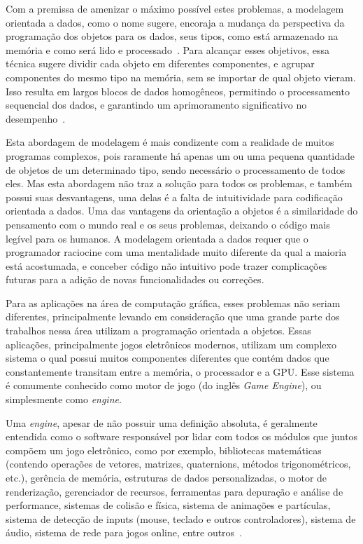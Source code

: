 \documentclass[11pt]{article}
\begin{document}
Com a premissa de amenizar o máximo possível estes problemas, a modelagem orientada a dados, como o nome sugere, encoraja a 
mudança da perspectiva da programação dos objetos para os dados, seus tipos, como está armazenado na memória e como será lido 
e processado~\cite{fabiandod}. Para alcançar esses objetivos, essa técnica sugere dividir cada objeto em diferentes 
componentes, e agrupar componentes do mesmo tipo na memória, sem se importar de qual objeto vieram. Isso resulta em largos 
blocos de dados homogêneos, permitindo o processamento sequencial dos dados, e garantindo um aprimoramento significativo 
no desempenho~\cite{fabiandod}.

Esta abordagem de modelagem é mais condizente com a realidade de muitos programas complexos, pois raramente há apenas um ou uma pequena 
quantidade de objetos de um determinado tipo, sendo necessário o processamento de todos eles. Mas esta abordagem não traz a 
solução para todos os problemas, e também possui suas desvantagens, uma delas é a falta de intuitividade para codificação 
orientada a dados. Uma das vantagens da orientação a objetos é a similaridade do pensamento com o mundo real e os seus 
problemas, deixando o código mais legível para os humanos. A modelagem orientada a dados requer que o programador raciocine com 
uma mentalidade muito diferente da qual a maioria está acostumada, e conceber código não intuitivo pode trazer complicações 
futuras para a adição de novas funcionalidades ou correções.

Para as aplicações na área de computação gráfica, esses problemas não seriam diferentes, principalmente levando em 
consideração que uma grande parte dos trabalhos nessa área utilizam a programação orientada a objetos. Essas aplicações, 
principalmente jogos eletrônicos modernos, utilizam um complexo sistema o qual possui muitos componentes diferentes que 
contém dados que constantemente transitam entre a memória, o processador e a GPU. Esse sistema é comumente conhecido 
como motor de jogo (do inglês \textit{Game Engine}), ou simplesmente como \textit{engine}.

Uma \textit{engine}, apesar de não possuir uma definição absoluta, é geralmente entendida como o software responsável por lidar com 
todos os módulos que juntos compõem um jogo eletrônico, como por exemplo, bibliotecas matemáticas (contendo operações de vetores, 
matrizes, quaternions, métodos trigonométricos, etc.), gerência de memória, 
estruturas de dados personalizadas, o motor de renderização, gerenciador de recursos, ferramentas para depuração e análise de performance, sistemas 
de colisão e física, sistema de animações e partículas, sistema de detecção de inputs (mouse, teclado e outros controladores),
sistema de áudio, sistema de rede para jogos online, entre outros~\cite{gregory2009game}.
\end{document}

